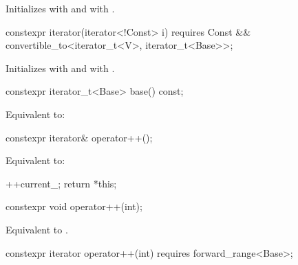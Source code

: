 \begin{itemdescr}
\pnum
\effects
Initializes  with  and
 with .
\end{itemdescr}

%
\begin{itemdecl}
constexpr iterator(iterator<!Const> i)
  requires Const && convertible_to<iterator_t<V>, iterator_t<Base>>;
\end{itemdecl}

\begin{itemdescr}
\pnum
\effects
Initializes  with  and
 with .
\end{itemdescr}

%
\begin{itemdecl}
constexpr iterator_t<Base> base() const;
\end{itemdecl}

\begin{itemdescr}
\pnum
\effects
Equivalent to: 
\end{itemdescr}

%
\begin{itemdecl}
constexpr iterator& operator++();
\end{itemdecl}

\begin{itemdescr}
\pnum
\effects
Equivalent to:
\begin{codeblock}
++current_;
return *this;
\end{codeblock}
\end{itemdescr}

%
\begin{itemdecl}
constexpr void operator++(int);
\end{itemdecl}

\begin{itemdescr}
\pnum
\effects
Equivalent to .
\end{itemdescr}

%
\begin{itemdecl}
constexpr iterator operator++(int) requires forward_range<Base>;
\end{itemdecl}


